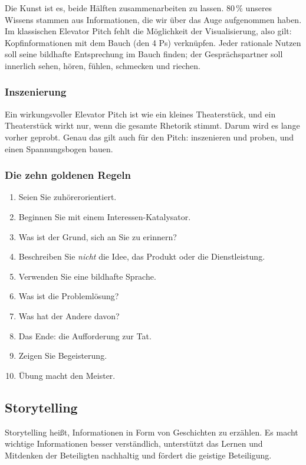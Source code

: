 \documentclass[12pt, a4paper]{article}
\begin{document}
Die Kunst ist es, beide Hälften zusammenarbeiten zu lassen. 80\,\% unseres
Wissens stammen aus Informationen, die wir über das Auge aufgenommen haben.
Im klassischen Elevator Pitch fehlt die Möglichkeit der Visualisierung, also
gilt: Kopfinformationen mit dem Bauch (den 4 Ps) verknüpfen. Jeder rationale
Nutzen soll seine bildhafte Entsprechung im Bauch finden; der
Gesprächspartner soll innerlich sehen, hören, fühlen, schmecken und riechen.

\subsubsection{Inszenierung}

Ein wirkungsvoller Elevator Pitch ist wie ein kleines Theaterstück, und ein
Theaterstück wirkt nur, wenn die gesamte Rhetorik stimmt. Darum wird es lange
vorher geprobt. Genau das gilt auch für den Pitch: inszenieren und proben,
und einen Spannungsbogen bauen.

\subsubsection{Die zehn goldenen Regeln}

\begin{enumerate}
  \item Seien Sie zuhörerorientiert.
  \item Beginnen Sie mit einem Interessen-Katalysator.
  \item Was ist der Grund, sich an Sie zu erinnern?
  \item Beschreiben Sie \emph{nicht} die Idee, das Produkt oder die
        Dienstleistung.
  \item Verwenden Sie eine bildhafte Sprache.
  \item Was ist die Problemlösung?
  \item Was hat der Andere davon?
  \item Das Ende: die Aufforderung zur Tat.
  \item Zeigen Sie Begeisterung.
  \item Übung macht den Meister.
\end{enumerate}

\subsection{Storytelling}

Storytelling heißt, Informationen in Form von Geschichten zu erzählen. Es
macht wichtige Informationen besser verständlich, unterstützt das Lernen und
Mitdenken der Beteiligten nachhaltig und fördert die geistige Beteiligung.
\end{document}
